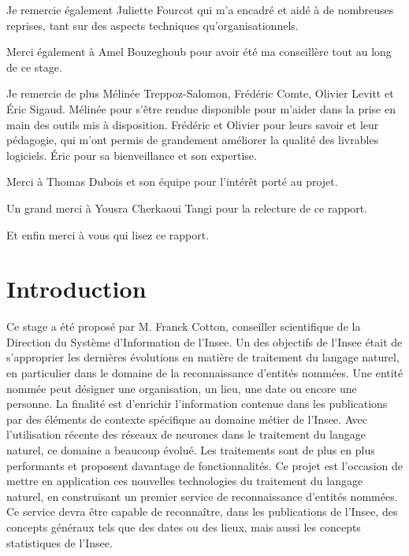 \documentclass[11pt, oneside, a4paper, titlepage, french]{article}
\begin{document}
Je remercie également Juliette Fourcot qui m'a encadré et aidé à de nombreuses reprises, tant sur des aspects techniques qu'organisationnels.
\newline

Merci également à Amel Bouzeghoub pour avoir été ma conseillère tout au long de ce stage.
\newline

Je remercie de plus Mélinée Treppoz-Salomon, Frédéric Comte, Olivier Levitt et Éric Sigaud. Mélinée pour s'être rendue disponible pour m'aider dans la prise en main des outils mis à disposition. Frédéric et Olivier pour leurs savoir et leur pédagogie, qui m'ont permis de grandement améliorer la qualité des livrables logiciels. Éric pour sa bienveillance et son expertise.
\newline

Merci à Thomas Dubois et son équipe pour l'intérêt porté au projet.
\newline

Un grand merci à Yousra Cherkaoui Tangi pour la relecture de ce rapport.
\newline

Et enfin merci à vous qui lisez ce rapport.
\newpage

\tableofcontents
\newpage


\section*{Introduction}
Ce stage a été proposé par M. Franck Cotton, conseiller scientifique de la Direction du Système d'Information de l'Insee. Un des objectifs de l'Insee était de s'approprier les dernières évolutions en matière de traitement du langage naturel, en particulier dans le domaine de la reconnaissance d'entités nommées. Une entité nommée peut désigner une organisation, un lieu, une date ou encore une personne. La finalité est d'enrichir l'information contenue dans les publications par des éléments de contexte spécifique au domaine métier de l'Insee. Avec l'utilisation récente des réseaux de neurones dans le traitement du langage naturel, ce domaine a beaucoup évolué. Les traitements sont de plus en plus performants et proposent davantage de fonctionnalités. Ce projet est l'occasion de mettre en application ces nouvelles technologies du traitement du langage naturel, en construisant un premier service de reconnaissance d'entités nommées. Ce service devra être capable de reconnaître, dans les publications de l'Insee, des concepts généraux tels que des dates ou des lieux, mais aussi les concepts statistiques de l'Insee.
\newline
\end{document}
